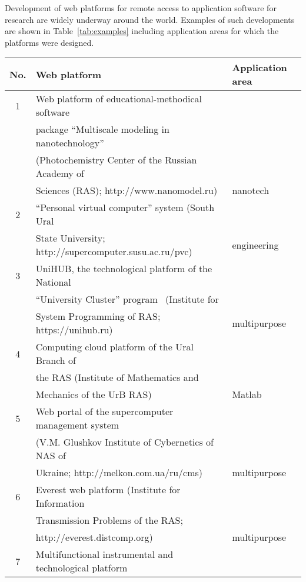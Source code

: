 \documentclass[procedia]{easychair}
\begin{document}
Development of web platforms for remote access to application software for research are widely underway around the world. Examples of such developments are shown in Table~\ref{tab:examples} including application areas for which the platforms were designed.
\begin{table}[htp]
	\begin{centering}
		\begin{tabular}{|c|l|l|}
		\hline
        \textbf{No.} &	\textbf{Web platform}   & \textbf{Application area} \\
	    \hline
	    1 & Web platform of educational-methodical software &\\
	      & package ``Multiscale modeling in nanotechnology'' \cite{11}&\\
	      &  (Photochemistry Center of the Russian Academy of & \\
	      & Sciences (RAS); http://www.nanomodel.ru) & nanotech\\
	    \hline
	    2 & ``Personal virtual computer'' system \cite{12} (South Ural & \\
	      &  State University; http://supercomputer.susu.ac.ru/pvc) & engineering\\
	    \hline
	    3 & UniHUB, the technological platform of the National & \\
	      & ``University Cluster'' program \cite{13} (Institute for &\\
	      & System Programming of RAS; https://unihub.ru) &  multipurpose\\
	    \hline
	    4 & Computing cloud platform of the Ural Branch of & \\
	      & the RAS \cite{14} (Institute of Mathematics and & \\
	      & Mechanics of the UrB RAS) & Matlab\\
	    \hline
	    5 & Web portal of the supercomputer management system \cite{15} & \\
	      & (V.M. Glushkov Institute of Cybernetics of NAS of & \\
	      &  Ukraine; http://melkon.com.ua/ru/cms) & multipurpose\\
	    \hline
	    6 & Everest web platform \cite{16} (Institute for Information & \\
	      & Transmission Problems of the RAS; & \\
	      & http://everest.distcomp.org) & multipurpose\\
	    \hline
	    7 & Multifunctional instrumental and technological platform&\\ 

\end{tabular}
\end{centering}
\end{table}
\end{document}
